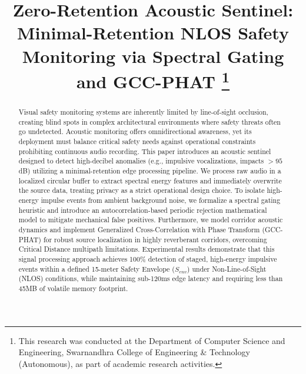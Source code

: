 \documentclass[conference]{IEEEtran}
\begin{document}
\title{Zero-Retention Acoustic Sentinel: Minimal-Retention NLOS Safety Monitoring via Spectral Gating and GCC-PHAT
\thanks{This research was conducted at the Department of Computer Science and Engineering, Swarnandhra College of Engineering \& Technology (Autonomous), as part of academic research activities.}
}

\author{
}

\maketitle

\begin{abstract}
Visual safety monitoring systems are inherently limited by line-of-sight occlusion, creating blind spots in complex architectural environments where safety threats often go undetected. Acoustic monitoring offers omnidirectional awareness, yet its deployment must balance critical safety needs against operational constraints prohibiting continuous audio recording. This paper introduces an acoustic sentinel designed to detect high-decibel anomalies (e.g., impulsive vocalizations, impacts $>95$dB) utilizing a minimal-retention edge processing pipeline. We process raw audio in a localized circular buffer to extract spectral energy features and immediately overwrite the source data, treating privacy as a strict operational design choice. To isolate high-energy impulse events from ambient background noise, we formalize a spectral gating heuristic and introduce an autocorrelation-based periodic rejection mathematical model to mitigate mechanical false positives. Furthermore, we model corridor acoustic dynamics and implement Generalized Cross-Correlation with Phase Transform (GCC-PHAT) for robust source localization in highly reverberant corridors, overcoming Critical Distance multipath limitations. Experimental results demonstrate that this signal processing approach achieves 100\% detection of staged, high-energy impulsive events within a defined 15-meter Safety Envelope ($S_{env}$) under Non-Line-of-Sight (NLOS) conditions, while maintaining sub-120ms edge latency and requiring less than 45MB of volatile memory footprint.
\end{abstract}
\end{document}

